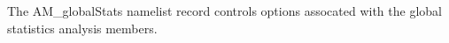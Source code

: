 The AM\_globalStats namelist record controls options assocated with the global statistics analysis members.
